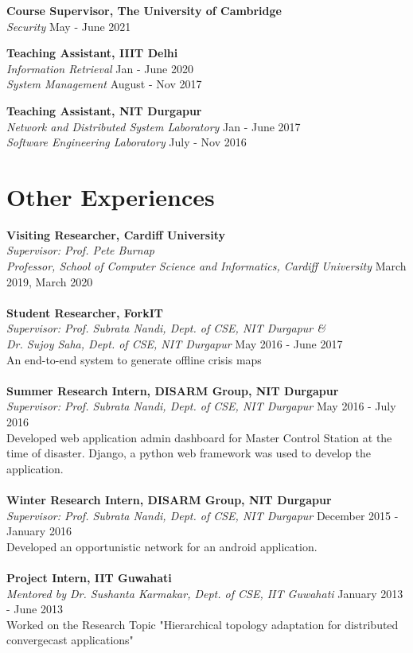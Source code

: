 \documentclass[margin, centered]{res}
\begin{document}
\begin{resume}
\textbf{Course Supervisor, The University of Cambridge} \\
\emph{Security} \hfill May - June 2021

\textbf{Teaching Assistant, IIIT Delhi} \\
\emph{Information Retrieval} \hfill Jan - June 2020 \\
\emph{System Management} \hfill August - Nov 2017


\textbf{Teaching Assistant, NIT Durgapur} \\
\emph{Network and Distributed System Laboratory} \hfill Jan - June 2017 \\
\emph{Software Engineering Laboratory} \hfill July - Nov 2016

\section{Other Experiences}

\textbf{Visiting Researcher, Cardiff University} \\
\emph{Supervisor: Prof. Pete Burnap \\ Professor, School of Computer Science and Informatics, Cardiff University} \hfill March 2019,  March 2020 \\
\\
\textbf{Student Researcher, ForkIT} \\
\emph{Supervisor: {Prof. Subrata Nandi, Dept. of CSE, NIT Durgapur} \& \\ {Dr. Sujoy Saha, Dept. of CSE, NIT Durgapur}} \hfill May 2016 - June 2017 \\
An end-to-end system to generate offline crisis maps \\
\\
\textbf{Summer Research Intern, DISARM Group, NIT Durgapur} \\
\emph{Supervisor: {Prof. Subrata Nandi, Dept. of CSE, NIT Durgapur}} \hfill May 2016 - July 2016 \\
Developed web application admin dashboard for Master Control Station at the time of disaster. Django, a python web framework was used to develop the application.\\
\\
\textbf{Winter Research Intern, DISARM Group, NIT Durgapur} \\
\emph{Supervisor: {Prof. Subrata Nandi, Dept. of CSE, NIT Durgapur}} \hfill December 2015 - January 2016 \\
Developed an opportunistic network for an android application.
\\
\\
\textbf{Project Intern, IIT Guwahati}  \\
\emph{Mentored by {Dr. Sushanta Karmakar, Dept. of CSE, IIT Guwahati}} \hfill January 2013 - June 2013 \\
Worked on the Research Topic "Hierarchical topology adaptation for distributed convergecast applications"



\end{resume}
\end{document}
